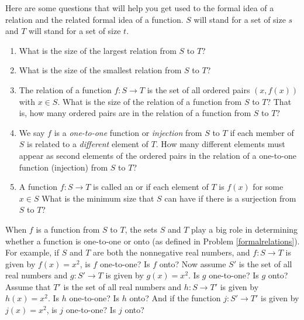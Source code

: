 \bp
\item Here are some questions that will help you get used to
the formal idea of a relation and the related formal idea of a
function.  $S$ will stand for a set of size
$s$ and
$T$ will stand for a set of size $t$.\label{formalrelations} 

\begin{enumerate}
\item What is the size of the largest relation from $S$ to $T$?
\item What is the size of the smallest relation from $S$ to
$T$?
\iffalse
\item  How many relations are there from the set
$S$ to the set
$T$?
\fi
\item The relation of a function $f:S\rightarrow T$ is the set
of all ordered pairs $(x,f(x))$ with $x\in S$.  What is the
size of the relation of a function from $S$ to $T$?  That is, how many
ordered pairs are in the relation of a function from $S$ to $T$?

\item We say $f$ is a {\em 
one-to-one} function or {\em injection} from
$S$ to
$T$ if each member of $S$ is related to a {\em different} element
of $T$. How many different elements must appear as second elements
of the ordered pairs in the relation of a one-to-one function
(injection) from
$S$ to
$T$?  
\item  A function $f:S\rightarrow T$ is called an  or
 if each
element of
$T$ is $f(x)$ for some $x\in S$ What is the minimum size that
$S$ can have if there is a  surjection from
$S$ to
$T$?\label{onto}
\end{enumerate}

\item When $f$ is  a function from $S$ to $T$, the sets $S$ and
$T$ play a big role in determining whether a function is
one-to-one or onto (as defined in Problem \ref{formalrelations}). 
For example, if $S$ and $T$ are both the nonnegative real numbers,
and $f:S\rightarrow T$ is given by $f(x) =x^2$, is $f$
one-to-one?  Is $f$ onto?  Now assume $S'$ is the set of all real
numbers and $g:S'\rightarrow T$ is given by $g(x) = x^2$.  Is $g$
one-to-one?  Is $g$ onto?  Assume that $T'$ is the set of all
real numbers and $h:S\rightarrow T'$ is given by $h(x) = x^2$.  Is
$h$ one-to-one?  Is $h$ onto?  And if the function
$j:S'\rightarrow T'$ is given by $j(x)=x^2$, is $j$ one-to-one? 
Is $j$ onto?


